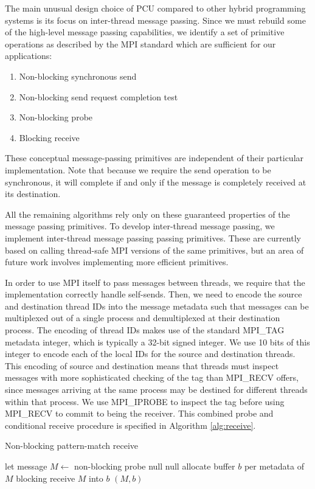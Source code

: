 \documentclass[final,1p,times]{elsarticle}
\begin{document}
The main unusual design choice of PCU compared to
other hybrid programming systems is
its focus on inter-thread message passing.
Since we must rebuild some of the high-level message
passing capabilities, we identify a set of primitive
operations as described by the MPI standard \cite{walker1996mpi}
which are sufficient for our applications:

\begin{enumerate}
\item Non-blocking synchronous send
\item Non-blocking send request completion test
\item Non-blocking probe
\item Blocking receive
\end{enumerate}

These conceptual message-passing primitives are independent
of their particular implementation.
Note that because we require the send operation to be synchronous,
it will complete if and only if the message is completely received at its
destination.

All the remaining algorithms rely only on these guaranteed properties
of the message passing primitives.
To develop inter-thread message passing, we implement inter-thread
message passing passing primitives.
These are currently based on calling thread-safe MPI versions of the
same primitives, but an area of future work involves implementing
more efficient primitives.

In order to use MPI itself to pass messages between threads, we require
that the implementation correctly handle self-sends.
Then, we need to encode the source and destination thread IDs into the message
metadata such that messages can be multiplexed out of a single process
and demultiplexed at their destination process.
The encoding of thread IDs makes use of the standard MPI\_TAG metadata
integer, which is typically a 32-bit signed integer.
We use 10 bits of this integer to encode each of the local IDs for the
source and destination threads.
This encoding of source and destination means that threads must inspect
messages with more sophisticated checking of the tag than MPI\_RECV
offers, since messages arriving at the same process may be destined
for different threads within that process.
We use MPI\_IPROBE to inspect the tag before using MPI\_RECV to commit
to being the receiver.
This combined probe and conditional receive procedure is specified
in Algorithm \ref{alg:receive}.

\begin{algorithm}
\caption{Non-blocking pattern-match receive}
\label{alg:receive}
\begin{algorithmic}
\State let message $M \gets$ non-blocking probe
\State \Return null
\EndIf
{}
\State \Return null
\EndIf
\State allocate buffer $b$ per metadata of $M$
\State blocking receive $M$ into $b$
\State \Return $(M,b)$
\EndFunction
\end{algorithmic}
\end{algorithm}
\end{document}
